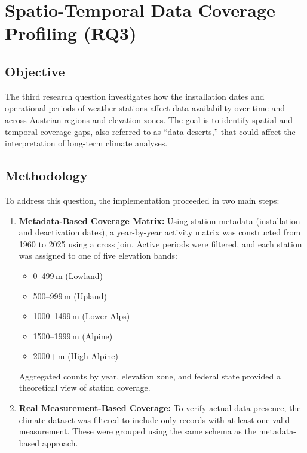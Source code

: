 \section{Spatio-Temporal Data Coverage Profiling (RQ3)}

\subsection*{Objective}
The third research question investigates how the installation dates and operational periods of weather stations affect data availability over time and across Austrian regions and elevation zones. The goal is to identify spatial and temporal coverage gaps, also referred to as ``data deserts,'' that could affect the interpretation of long-term climate analyses.

\subsection*{Methodology}

To address this question, the implementation proceeded in two main steps:

\begin{enumerate}
  \item \textbf{Metadata-Based Coverage Matrix:}  
    Using station metadata (installation and deactivation dates), a year-by-year activity matrix was constructed from 1960 to 2025 using a cross join. Active periods were filtered, and each station was assigned to one of five elevation bands:
    \begin{itemize}
      \item 0--499\,m (Lowland)
      \item 500--999\,m (Upland)
      \item 1000--1499\,m (Lower Alps)
      \item 1500--1999\,m (Alpine)
      \item 2000+\,m (High Alpine)
    \end{itemize}
    Aggregated counts by year, elevation zone, and federal state provided a theoretical view of station coverage.

  \item \textbf{Real Measurement-Based Coverage:}  
    To verify actual data presence, the climate dataset was filtered to include only records with at least one valid measurement. These were grouped using the same schema as the metadata-based approach.
\end{enumerate}

